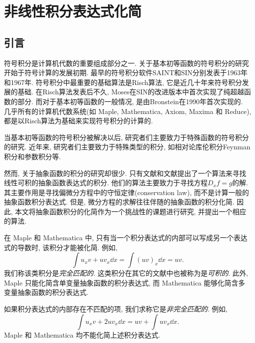 \chapter{非线性积分表达式化简}
\section{引言}\label{Introduction-03}

符号积分是计算机代数的重要组成部分之一. 关于基本初等函数的符号积分的研究开始于符号计算的发展初期. 最早的符号积分软件SAINT和SIN分别发表于1963年\citep{slagle1963}和1967年\citep{moses1967}. 符号积分中最重要的基础算法是Risch算法\citep{risch1969,risch1970}, 它是近几十年来符号积分发展的基础. 在Risch算法发表后不久, Moses在SIN的改进版本中首次实现了纯超越函数的部分\citep{moses1971}. 而对于基本初等函数的一般情况, 是由Bronstein在1990年首次实现的\citep{bronstein1990}. 几乎所有的计算机代数系统(如 Maple, Mathematica, Axiom, Maxima 和 Reduce), 都是以Risch算法为基础来实现符号积分的计算的. 

当基本初等函数的符号积分被解决以后, 研究者们主要致力于特殊函数的符号积分的研究\citep{cherry1985,cherry1986,bertrand1994,jeffrey1997}. 近年来, 研究者们主要致力于特殊类型的积分, 如相对论库伦积分\citep{paule2012,paule2013}\zdh Feynman积分\citep{blumlein2012,smirnov2015}和参数积分\citep{raab2016}等.

然而, 关于抽象函数的积分的研究却很少. 只有文献\cite{deconinck2009}和文献\cite{poole2010}提出了一个算法来寻找线性可积的抽象函数表达式的积分. 他们的算法主要致力于寻找方程$D_x f=g$的解. 其主要作用是寻找偏微分方程中的守恒定律(conservation law)\citep{poole2011}, 而不是计算一般的抽象函数积分表达式. 但是, 微分方程的求解往往伴随的抽象函数的积分化简. 因此, 本文将抽象函数积分的化简作为一个挑战性的课题进行研究, 并提出一个相应的算法.

在 Maple 和 Mathematica 中, 只有当一个积分表达式的内部可以写成另一个表达式的导数时, 该积分才能被化简. 例如, 
\begin{equation}
\int\!{u_xv+uv_x \dd x}=\int\!{(uv)_x\dd x}=uv.
\label{complete_matched}
\end{equation}
我们称该类积分是\emph{完全匹配的}. 这类积分在其它的文献中也被称为是\emph{可积的}. 此外, Maple 只能化简含单变量抽象函数的积分表达式, 而 Mathematica 能够化简含多变量抽象函数的积分表达式. 

如果积分表达式的内部存在不匹配的项, 我们求称它是\emph{非完全匹配的}. 例如,
\begin{equation}
\int\!{u_xv+2uv_x \dd x}=uv+\int\!{uv_x\dd x}.
\label{incomplete_matched}
\end{equation}
Maple 和 Mathematica 均不能化简上述积分表达式. 

